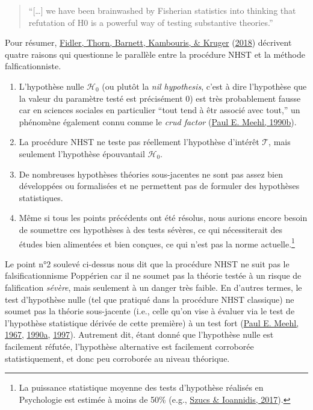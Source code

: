\documentclass[
  a4paper,11pt,twoside,onecolumn,openright,final,oldfontcommands]{memoir}
\theoremstyle{definition}
\theoremstyle{definition}
\theoremstyle{definition}
\theoremstyle{remark}
\begin{document}
\begin{quote}
``{[}\ldots{]} we have been brainwashed by Fisherian statistics into thinking that refutation of H0 is a powerful way of testing substantive theories.''
\end{quote}

Pour résumer, \protect\hyperlink{ref-fidler_epistemic_2018}{Fidler, Thorn, Barnett, Kambouris, \& Kruger} (\protect\hyperlink{ref-fidler_epistemic_2018}{2018}) décrivent quatre raisons qui questionne le parallèle entre la procédure NHST et la méthode falficationniste.

\begin{enumerate}
\def\labelenumi{\arabic{enumi}.}
\item
  L'hypothèse nulle \(\mathcal{H}_{0}\) (ou plutôt la \emph{nil hypothesis}, c'est à dire l'hypothèse que la valeur du paramètre testé est précisément \(0\)) est très probablement fausse car en sciences sociales en particulier ``tout tend à êtr associé avec tout,'' un phénomène également connu comme le \emph{crud factor} (\protect\hyperlink{ref-meehl_why_1990}{Paul E. Meehl, 1990b}).
\item
  La procédure NHST ne teste pas réellement l'hypothèse d'intérêt \(\mathcal{T}\), mais seulement l'hypothèse épouvantail \(\mathcal{H}_{0}\).
\item
  De nombreuses hypothèses théories sous-jacentes ne sont pas assez bien développées ou formalisées et ne permettent pas de formuler des hypothèses statistiques.
\item
  Même si tous les points précédents ont été résolus, nous aurions encore besoin de soumettre ces hypothèses à des tests sévères, ce qui nécessiterait des études bien alimentées et bien conçues, ce qui n'est pas la norme actuelle.\footnote{La puissance statistique moyenne des tests d'hypothèse réalisés en Psychologie est estimée à moins de 50\% (e.g., \protect\hyperlink{ref-szucs_empirical_2017-1}{Szucs \& Ioannidis, 2017}).}
\end{enumerate}

Le point n°2 soulevé ci-dessus nous dit que la procédure NHST ne suit pas le falsificationnisme Poppérien car il ne soumet pas la théorie testée à un risque de falification \emph{sévère}, mais seulement à un danger très faible. En d'autres termes, le test d'hypothèse nulle (tel que pratiqué dans la procédure NHST classique) ne soumet pas la théorie sous-jacente (i.e., celle qu'on vise à évaluer via le test de l'hypothèse statistique dérivée de cette première) à un test fort (\protect\hyperlink{ref-meehl_theory-testing_1967}{Paul E. Meehl, 1967}, \protect\hyperlink{ref-meehl_appraising_1990}{1990a}, \protect\hyperlink{ref-harlow_problem_1997}{1997}). Autrement dit, étant donné que l'hypothèse nulle est facilement réfutée, l'hypothèse alternative est facilement corroborée statistiquement, et donc peu corroborée au niveau théorique.
\end{document}
